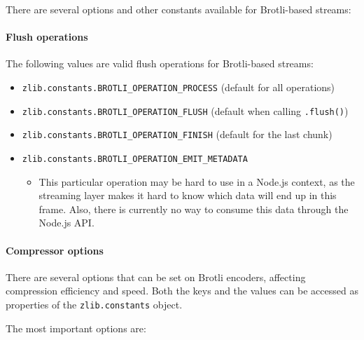 There are several options and other constants available for Brotli-based
streams:

\paragraph{Flush operations}\label{flush-operations}

The following values are valid flush operations for Brotli-based
streams:

\begin{itemize}
\tightlist
\item
  \texttt{zlib.constants.BROTLI\_OPERATION\_PROCESS} (default for all
  operations)
\item
  \texttt{zlib.constants.BROTLI\_OPERATION\_FLUSH} (default when calling
  \texttt{.flush()})
\item
  \texttt{zlib.constants.BROTLI\_OPERATION\_FINISH} (default for the
  last chunk)
\item
  \texttt{zlib.constants.BROTLI\_OPERATION\_EMIT\_METADATA}

  \begin{itemize}
  \tightlist
  \item
    This particular operation may be hard to use in a Node.js context,
    as the streaming layer makes it hard to know which data will end up
    in this frame. Also, there is currently no way to consume this data
    through the Node.js API.
  \end{itemize}
\end{itemize}

\paragraph{Compressor options}\label{compressor-options}

There are several options that can be set on Brotli encoders, affecting
compression efficiency and speed. Both the keys and the values can be
accessed as properties of the \texttt{zlib.constants} object.

The most important options are:

